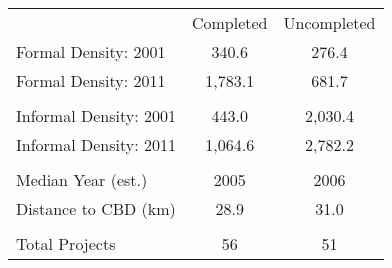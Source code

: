 \begin{tabu}{lcc}
 & Completed & Uncompleted \\ 
 Formal Density: 2001  & 340.6  & 276.4  \\ 
 Formal Density: 2011  & 1,783.1  & 681.7  \\ 
 &  &  \\ 
 Informal Density: 2001  & 443.0  & 2,030.4  \\ 
 Informal Density: 2011  & 1,064.6  & 2,782.2  \\ 
 &  &  \\ 
 Median Year (est.)  & 2005  & 2006  \\ 
 Distance to CBD (km)  & 28.9  & 31.0  \\ 
 &  &  \\ 
 Total Projects   & 56  & 51  \\ 
\bottomrule
\end{tabu}

